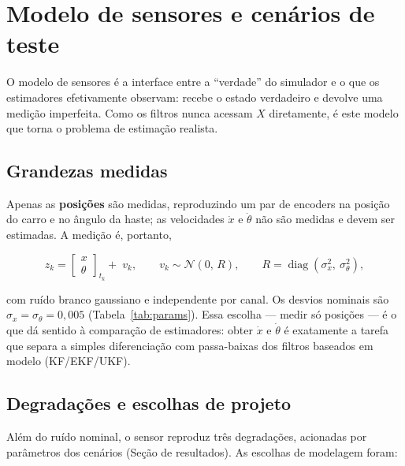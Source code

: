 \documentclass[brazil, 12pt]{article}
\begin{document}
\section{Modelo de sensores e cenários de teste}
\label{sec:sensores}

O modelo de sensores é a interface entre a ``verdade'' do simulador e o que os
estimadores efetivamente observam: recebe o estado verdadeiro e devolve uma
medição imperfeita. Como os filtros nunca acessam $X$ diretamente, é este
modelo que torna o problema de estimação realista.

\subsection{Grandezas medidas}

Apenas as \textbf{posições} são medidas, reproduzindo um par de encoders na
posição do carro e no ângulo da haste; as velocidades $\dot{x}$ e $\dot{\theta}$
não são medidas e devem ser estimadas. A medição é, portanto,

\[
z_k =
\begin{bmatrix} x \\ \theta \end{bmatrix}_{t_k}
+\; v_k,
\qquad
v_k \sim \mathcal{N}(0,\,R),
\qquad
R = \operatorname{diag}\!\left(\sigma_x^{2},\ \sigma_\theta^{2}\right),
\]

com ruído branco gaussiano e independente por canal. Os desvios nominais são
$\sigma_x = \sigma_\theta = 0{,}005$ (Tabela~\ref{tab:params}). Essa escolha ---
medir só posições --- é o que dá sentido à comparação de estimadores: obter
$\dot{x}$ e $\dot{\theta}$ é exatamente a tarefa que separa a simples
diferenciação com passa-baixas dos filtros baseados em modelo (KF/EKF/UKF).

\subsection{Degradações e escolhas de projeto}

Além do ruído nominal, o sensor reproduz três degradações, acionadas por
parâmetros dos cenários (Seção de resultados). As escolhas de modelagem foram:
\end{document}
